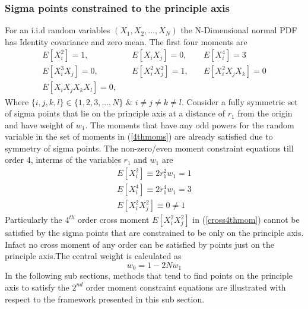 \documentclass[letterpaper, 10 pt, conference]{ieeeconf}  %
\begin{document}
\subsubsection{Sigma points constrained to the principle axis}
For an i.i.d random variables $(X_1,X_2,...,X_N)$ the N-Dimensional normal PDF has Identity covariance and zero mean. The first four moments are
\setlength{\arraycolsep}{0.0em}
\begin{eqnarray}
E[X_i^2]=1,& \quad E[X_iX_j]=0,& \quad E[X_i^4]=3 \nonumber\\
E[X_i^3X_j]=0,& \quad E[X_i^2X_j^2]=1,& \quad E[X_i^2X_jX_k]=0 \nonumber\\
E[X_iX_jX_kX_l]=0,&   & \label{4thmoms}
\end{eqnarray}
\setlength{\arraycolsep}{5pt}
Where $\{i,j,k,l\}\in\{1,2,3,...,N\}$ $\&$ $i \neq j \neq k \neq l$.
Consider a fully symmetric set of sigma points that lie on the principle axis at a distance of $r_1$ from the origin and have weight of $w_1$. The moments that have any odd powers for the random variable in the set of moments in (\ref{4thmoms}) are already satisfied due to symmetry of sigma points. The non-zero/even moment constraint equations till order 4, interms of the variables $r_1$ and $w_1$ are 
\setlength{\arraycolsep}{0.0em}
\begin{eqnarray}
E[X_i^2]\equiv2r_1^2w_1=1 \label{str2ndmom}\\
E[X_i^4]\equiv2r_1^4w_1=3 \label{str4thmom}\\
E[X_i^2X_j^2]\equiv0\neq1 \label{cross4thmom}
\end{eqnarray}
\setlength{\arraycolsep}{5pt}
Particularly the $4^{th}$ order cross moment $E[X_i^2X_j^2]$ in (\ref{cross4thmom}) cannot be satisfied by the sigma points that are constrained to be only on the principle axis. Infact no cross moment of any order can be satisfied by points just on the principle axis.The central weight is calculated as
\begin{equation}
w_0=1-2Nw_1 \label{centwt2ndequi}
\end{equation}
In the following sub sections, methods that tend to find points on the principle axis to satisfy the $2^{nd}$ order moment constraint equations are illustrated with respect to the framework presented in this sub section. 

\end{document}
